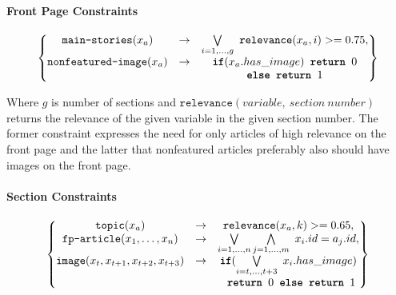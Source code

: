 \paragraph{Front Page Constraints}
\begin{align}
	\begin{Bmatrix}
		\texttt{main-stories}(x_a) &\rightarrow& \bigvee\limits_{i=1,\dots,g}\ \texttt{relevance}(x_a,i) >= 0.75,\\
		\texttt{nonfeatured-image}(x_a) &\rightarrow& \texttt{\textbf{if}}(x_a.has\_image) \texttt{\textbf{ return }}0\\
		&&\texttt{\textbf{else return }}1
	\end{Bmatrix}
\end{align}

Where $g$ is number of sections and $\texttt{relevance}(variable,\ section\ number)$ returns the relevance of the given variable in the given section number. The former constraint expresses the need for only articles of high relevance on the front page and the latter that nonfeatured articles preferably also should have images on the front page.

\paragraph{Section Constraints}
\begin{align}
	\begin{Bmatrix}
		\texttt{topic}(x_a) &\rightarrow& \texttt{relevance}(x_a,k) >= 0.65,\\
		\texttt{fp-article}(x_1,\dots,x_n) &\rightarrow& \bigvee\limits_{i=1,\dots,n}\bigwedge\limits_{j=1,\dots,m}\ x_i.id = a_j.id,\\
		\texttt{image}(x_t, x_{t+1}, x_{t+2}, x_{t+3}) &\rightarrow& \texttt{\textbf{if}}(\bigvee\limits_{i=t,\dots,t+3}\ x_i.has\_image)\\
		&& \texttt{\textbf{ return }}0\texttt{\textbf{ else return }}1
	\end{Bmatrix}
\end{align}


